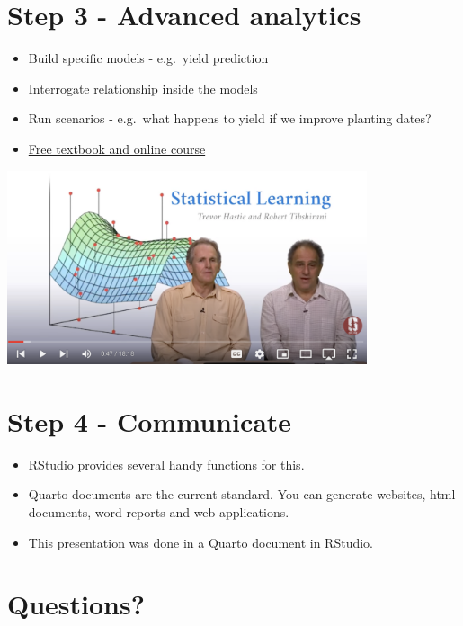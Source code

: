 \documentclass[
  letterpaper,
  DIV=11,
  numbers=noendperiod]{scrreprt}
\providecommand{\tightlist}{%
  \setlength{\itemsep}{0pt}\setlength{\parskip}{0pt}}\usepackage{longtable,booktabs,array}
\begin{document}
\hypertarget{step-3---advanced-analytics}{%
\section{Step 3 - Advanced
analytics}\label{step-3---advanced-analytics}}

\begin{itemize}
\tightlist
\item
  Build specific models - e.g.~yield prediction
\item
  Interrogate relationship inside the models
\item
  Run scenarios - e.g.~what happens to yield if we improve planting
  dates?
\item
  \href{https://www.statlearning.com/online-courses}{Free textbook and
  online course}
\end{itemize}

\includegraphics[width=4.16667in,height=\textheight]{training-materials/presentation/isl.png}

\hypertarget{step-4---communicate}{%
\section{Step 4 - Communicate}\label{step-4---communicate}}

\begin{itemize}
\tightlist
\item
  RStudio provides several handy functions for this.
\item
  Quarto documents are the current standard. You can generate websites,
  html documents, word reports and web applications.
\item
  This presentation was done in a Quarto document in RStudio.
\end{itemize}

\hypertarget{questions}{%
\section{Questions?}\label{questions}}
\end{document}
